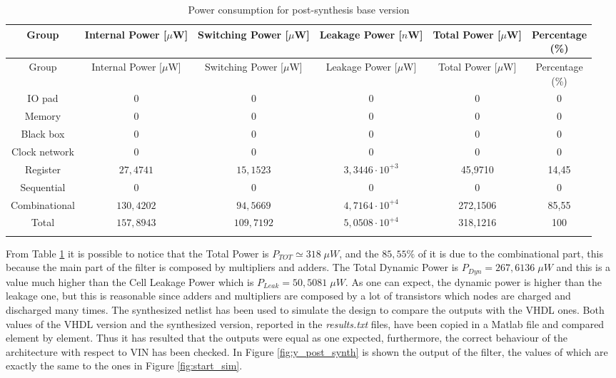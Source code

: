 \documentclass[a4paper, titlepage]{article}
\begin{document}
\begin{longtable}{*6c}
\caption{Power consumption for post-synthesis base version}
\label{tab:power_postsynth_base}\\
\toprule
Group & \thead{Internal\\Power [$\mu$W]} & \thead{Switching\\Power [$\mu$W]} & \thead{Leakage\\Power [$n$W]} & \thead{Total\\Power  [$\mu$W]}& \thead{Percentage\\(\%)}\\
\midrule
\endfirsthead
Group & \thead{Internal\\Power [$\mu$W]} & \thead{Switching\\Power [$\mu$W]} & \thead{Leakage\\Power [$\mu$W]} & \thead{Total\\Power  [$\mu$W]}& \thead{Percentage\\(\%)}\\
\midrule
\endhead
\midrule
\endfoot
IO pad & 0 & 0 & 0 & 0 & 0\\
Memory & 0 & 0 & 0 & 0 & 0\\
Black box & 0 & 0 & 0 & 0 & 0\\
Clock network & 0 & 0 & 0 & 0 & 0\\
Register & $27,4741 $ & $15,1523 $ & $3,3446 \cdot10^{+3}$ & 45,9710 & 14,45\\
Sequential & 0 & 0 & 0 & 0 & 0\\
Combinational  & $130,4202 $ & $94,5669$ & $4,7164 \cdot10^{+4}$ & 272,1506 & 85,55\\
\bottomrule
Total & $157,8943 $ & $109,7192$ & $5,0508 \cdot10^{+4}$ & 318,1216 & 100\\
\endlastfoot
\end{longtable}
\noindent
From Table \ref{tab:power_postsynth_base} it is possible to notice that the Total Power is $P_{TOT} \simeq318 \; \mu W$, and the $85,55 \%$ of it is due to the combinational part, this because the main part of the filter is composed by multipliers and adders.
\newline The Total Dynamic Power is $P_{Dyn}=267,6136 \;\mu W$ and this is a value much higher than the Cell Leakage Power which is $P_{Leak}=50,5081 \; \mu W$. As one can expect, the dynamic power is higher than the leakage one, but this is reasonable since adders and multipliers are composed by a lot of transistors which nodes are charged and discharged many times.
\newline
The synthesized netlist has been used to simulate the design to compare the outputs with the VHDL ones. Both values of the VHDL version and the synthesized version, reported in the \textit{results.txt} files, have been copied in a Matlab file and compared element by element. Thus it has resulted that the outputs were equal as one expected, furthermore, the correct behaviour of the architecture with respect to VIN has been checked. 
\newline In Figure \ref{fig:y_post_synth} is shown the output of the filter, the values of which are exactly the same to the ones in Figure \ref{fig:start_sim}.
\end{document}
